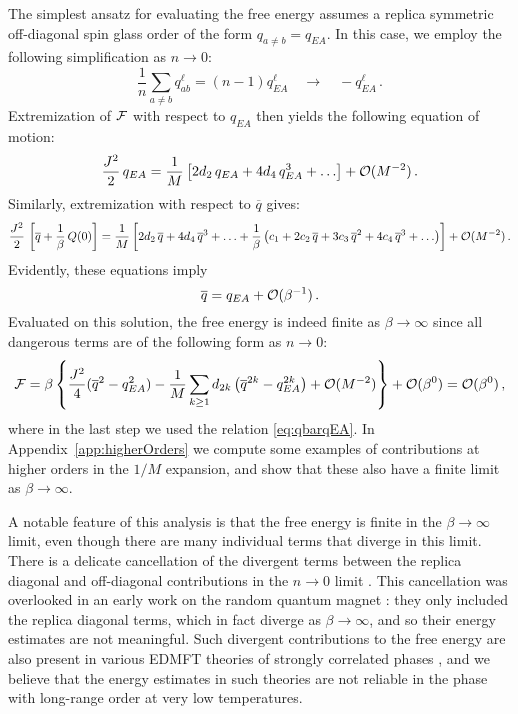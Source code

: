 \documentclass[aps,prx,preprint,onecolumn,citeautoscript,superscriptaddress,nofootinbib,
eqsecnum]{revtex4}
\begin{document}
{The simplest ansatz for evaluating the free energy assumes a replica symmetric off-diagonal spin glass order of the form $q_{a\neq b} = q_{EA}$. In this case, we employ the following simplification as $n\rightarrow 0$:
\begin{equation}
\frac{1}{n} \sum_{a\neq b} q_{ab}^\ell = (n-1) q_{EA}^\ell \quad \longrightarrow \quad -q_{EA}^\ell \,.
\end{equation}
Extremization of ${\cal F}$ with respect to $q_{EA}$ then yields the following equation of motion:
\begin{equation}
    \frac{J^2}{2} \, q_{EA} = \frac{1}{M} \left[  2d_2 \, q_{EA} + 4 d_4 \, q_{EA}^3 + \ldots \right] + {\cal O}(M^{-2})\,.
\end{equation}
Similarly, extremization with respect to $\overline{q}$ gives:
\begin{equation}
    \frac{J^2}{2} \, \left[ \overline{q} +\frac{1}{\beta} \, Q(0) \right] =  \frac{1}{M} \left[   2d_2 \, \overline{q} + 4 d_4 \, \overline{q}^3 + \ldots + \frac{1}{\beta} \left( c_1 + 2 c_2\,\overline{q} + 3c_3\,\overline{q}^2 + 4 c_4\,\overline{q}^3    + \ldots\right) \right] + {\cal O}(M^{-2})\,.
\end{equation}
Evidently, these equations imply
\begin{equation}
\label{eq:qbarqEA}
    \overline{q} = q_{EA} + {\cal O}(\beta^{-1}) \,.
\end{equation}
Evaluated on this solution, the free energy is indeed finite as $\beta \rightarrow \infty$ since all dangerous terms are of the following form as $n\rightarrow 0$:
\begin{equation}
   {\cal F} =  \beta \left\{ \frac{ J^2}{4} (\overline{q}^2-q_{EA}^2 ) 
    - \frac{1}{M} \sum_{k\geq 1} d_{2k} \left( \overline{q}^{2k}-q_{EA}^{2k} \right)
    + {\cal O}(M^{-2})\right\}+ {\cal O}(\beta^0)  = {\cal O}(\beta^0) \,,
\end{equation}
where in the last step we used the relation \eqref{eq:qbarqEA}. In Appendix~\ref{app:higherOrders} we compute some examples of contributions at higher orders in the $1/M$ expansion, and show that these also have a finite limit as $\beta \rightarrow \infty$.


A notable feature of this analysis is that the free energy is finite in the $\beta \rightarrow \infty$ limit, even though there are many individual terms that diverge in this limit. There is a delicate cancellation of the divergent terms between the replica diagonal and off-diagonal contributions in the $n \rightarrow 0$ limit \cite{RSY95}.
This cancellation was overlooked in an early work on the random quantum magnet \cite{BrayMoore}: they only included the replica diagonal terms, which in fact diverge as $\beta \rightarrow \infty$, and so their energy estimates are not meaningful. Such divergent contributions to the free energy are also present in various EDMFT theories of strongly correlated phases \cite{Werner10,Akerlund:2013fsa,Akerlund:2014mea,Si1,SiIsing2,SiIsing3}, and we believe that the energy estimates in such theories are not reliable in the phase with long-range order at very low temperatures.


}
\end{document}

